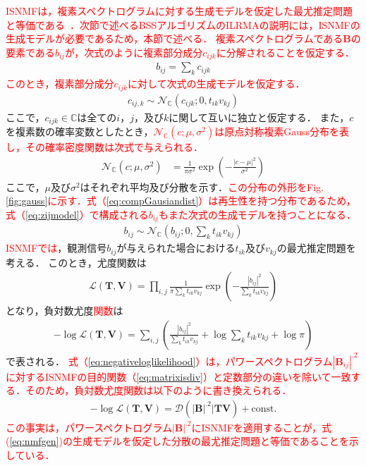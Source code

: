 \textcolor{red}{ISNMFは，複素スペクトログラムに対する生成モデルを仮定した最尤推定問題と等価である~\cite{isnmf}．次節で述べるBSSアルゴリズムのILRMAの説明には，ISNMFの生成モデルが必要であるため，本節で述べる．}
\textcolor{red}{複素スペクトログラムである$\bm{B}$の要素である$b_{ij}$が，次式のように複素部分成分$c_{ijk}$に分解されることを仮定する．}
\begin{align}
    b_{ij} = \sum_k c_{ijk}　\label{eq:zijmodel}
\end{align}
\textcolor{red}{このとき，複素部分成分$c_{ijk}$に対して次式の生成モデルを仮定する．}
\begin{align}
    c_{ij,k} \sim \mathcal{N}_{\mathbb{C}} (c_{ijk}; 0, t_{ik}v_{kj})
\end{align}
ここで，$c_{ijk}\in \mathbb{C}$は全ての$i$，$j$，及び$k$に関して互いに独立と仮定する．
また，$c$を複素数の確率変数としたとき，\textcolor{red}{$\mathcal{N}_{\mathbb{C}} (c; \mu, \sigma^2)$は原点対称複素Gauss分布を表し，その確率密度関数は次式で与えられる．}
\begin{align}
    \mathcal{N}_{\mathbb{C}} (c; \mu, \sigma^2) &= \frac{1}{\pi \sigma^2} \exp \left( -\frac{|c-\mu|^2}{\sigma^2} \right) \label{eq:compGausiandist}
\end{align}
ここで，$\mu$及び$\sigma^2$はそれぞれ平均及び分散を示す．\textcolor{red}{この分布の外形をFig. \ref{fig:gauss}に示す．式（\ref{eq:compGausiandist}）は再生性を持つ分布であるため，式（\ref{eq:zijmodel}）で構成される$b_{ij}$もまた次式の生成モデルを持つことになる．}
\begin{align}
    b_{ij} \sim \mathcal{N}_{\mathbb{C}}\left( b_{ij}; 0, \sum_k t_{ik} v_{kj} \right) \label{eq:nmfgen}
\end{align}
\textcolor{red}{ISNMFでは}，観測信号$b_{ij}$が与えられた場合における$t_{ik}$及び$v_{kj}$の最尤推定問題を考える．
このとき，尤度関数は
\begin{align}
    \mathcal{L}(\bm{T}, \bm{V}) = \prod_{i,j} \frac{1}{\pi \sum_k t_{ik} v_{kj} } \exp \left( -\frac{|b_{ij}|^2}{\sum_k t_{ik} v_{kj}} \right)
\end{align}
となり，負対数尤度\textcolor{red}{関数}は
\begin{align}
    -\log\mathcal{L}(\bm{T}, \bm{V}) = \sum_{i,j} \left( \frac{|b_{ij}|^2}{\sum_k t_{ik} v_{kj}} + \log \sum_k t_{ik} v_{kj} + \log \pi \right) \label{eq:negativeloglikelihood}
\end{align}
で表される．
\textcolor{red}{式（\ref{eq:negativeloglikelihood}）は，パワースペクトログラム$|\bm{B}_{ij}|^{.2}$に対するISNMFの目的関数（\ref{eq:matrixisdiv}）と定数部分の違いを除いて一致する．そのため，負対数尤度関数は以下のように書き換えられる．}
\begin{align}
    -\log\mathcal{L}(\bm{T}, \bm{V}) = \mathcal{D} \left( |\bm{B}|^{.2} | \bm{TV} \right) + \mathrm{const.}
    \label{eq:isnmf}
\end{align}
\textcolor{red}{この事実は，パワースペクトログラム$|\bm{B}|^{.2}$にISNMFを適用することが，式(\ref{eq:nmfgen})の生成モデルを仮定した分散の最尤推定問題と等価であることを示している\cite{GGD}．}

